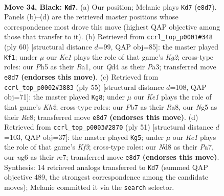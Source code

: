 \documentclass[11pt]{article}
\begin{document}
\clearpage

\begin{figure}[p]\centering
\begin{subfigure}{0.46\textwidth}\centering
\resizebox{\linewidth}{!}{%
\newchessgame
\chessboard[
  setfen={r2nk1Q1/1p4p1/p4pN1/6np/3q4/4P1P1/PP2RPBP/3R2K1 b - - 5 34},
  showmover=false,
  pgfstyle=straightmove, color=movearrow, markmove={e8-d7}
]}
\caption{}
\end{subfigure}\hfill
\begin{subfigure}{0.46\textwidth}\centering
\resizebox{\linewidth}{!}{%
\newchessgame
\chessboard[
  setfen={r4bk1/2Bq1pp1/p2P3p/2p5/7n/PQN3NP/5PK1/R7 w - - 5 31},
  showmover=false,
  pgfstyle=straightmove, color=movearrow, markmove={g2-f1}
]}
\caption{}
\end{subfigure}
\\[4pt]
\begin{subfigure}{0.46\textwidth}\centering
\resizebox{\linewidth}{!}{%
\newchessgame
\chessboard[
  setfen={r1r5/5ppk/1q2p1n1/3pP2Q/pP6/R1BP3P/5PP1/2R3K1 b - - 0 28},
  showmover=false,
  pgfstyle=straightmove, color=movearrow, markmove={h7-g8}
]}
\caption{}
\end{subfigure}\hfill
\begin{subfigure}{0.46\textwidth}\centering
\resizebox{\linewidth}{!}{%
\newchessgame
\chessboard[
  setfen={8/pp2R1bp/2p2kp1/4P3/2P2n2/BPN2q2/P1Q2P1P/5RK1 b - - 0 26},
  showmover=false,
  pgfstyle=straightmove, color=movearrow, markmove={f6-g5}
]}
\caption{}
\end{subfigure}
\caption{\textbf{Move 34, Black: \texttt{Kd7}.} (a) Our position; Melanie plays \texttt{Kd7} (\texttt{e8d7}). Panels (b)--(d) are the retrieved master positions whose correspondence most drove this move (highest QAP objective among those that transfer to it). (b) Retrieved from \texttt{ccrl\_top\_p0001\#348} (ply 60) [structural distance $d$=99, QAP obj=85]: the master played \texttt{Kf1}; under $\mu$ our \emph{Ke1} plays the role of that game's \emph{Kg2}; cross-type roles: our \emph{P}h5 as their \emph{R}a1, our \emph{Q}d4 as their \emph{P}a3; transferred move \texttt{e8d7} \textbf{(endorses this move)}. (c) Retrieved from \texttt{ccrl\_top\_p0002\#3883} (ply 55) [structural distance $d$=108, QAP obj=71]: the master played \texttt{Kg8}; under $\mu$ our \emph{Ke1} plays the role of that game's \emph{Kh2}; cross-type roles: our \emph{P}b7 as their \emph{R}a8, our \emph{N}g5 as their \emph{R}c8; transferred move \texttt{e8d7} \textbf{(endorses this move)}. (d) Retrieved from \texttt{ccrl\_top\_p0003\#2870} (ply 51) [structural distance $d$=103, QAP obj=37]: the master played \texttt{Kg5}; under $\mu$ our \emph{Ke1} plays the role of that game's \emph{Kf3}; cross-type roles: our \emph{N}d8 as their \emph{P}a7, our \emph{n}g6 as their \emph{r}e7; transferred move \texttt{e8d7} \textbf{(endorses this move)}. Synthesis: 14 retrieved analogs transferred to \texttt{Kd7} (summed QAP objective 489, the strongest correspondence among the candidate moves); Melanie committed it via the \texttt{search} selector.}
\label{fig:thought-m67}
\end{figure}
\end{document}
